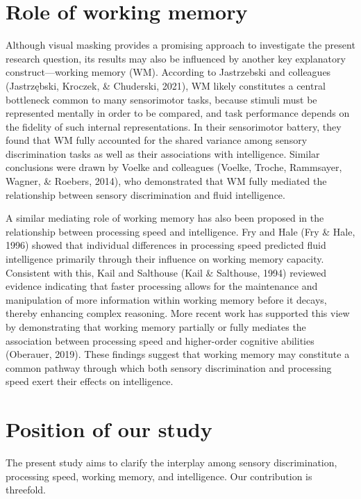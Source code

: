 \documentclass[
  ,man]{apa6}
\begin{document}
\section{Role of working memory}\label{role-of-working-memory}

Although visual masking provides a promising approach to investigate the present research question, its results may also be influenced by another key explanatory construct---working memory (WM). According to Jastrzebski and colleagues (Jastrzębski, Kroczek, \& Chuderski, 2021), WM likely constitutes a central bottleneck common to many sensorimotor tasks, because stimuli must be represented mentally in order to be compared, and task performance depends on the fidelity of such internal representations. In their sensorimotor battery, they found that WM fully accounted for the shared variance among sensory discrimination tasks as well as their associations with intelligence. Similar conclusions were drawn by Voelke and colleagues (Voelke, Troche, Rammsayer, Wagner, \& Roebers, 2014), who demonstrated that WM fully mediated the relationship between sensory discrimination and fluid intelligence.

A similar mediating role of working memory has also been proposed in the relationship between processing speed and intelligence. Fry and Hale (Fry \& Hale, 1996) showed that individual differences in processing speed predicted fluid intelligence primarily through their influence on working memory capacity. Consistent with this, Kail and Salthouse (Kail \& Salthouse, 1994) reviewed evidence indicating that faster processing allows for the maintenance and manipulation of more information within working memory before it decays, thereby enhancing complex reasoning. More recent work has supported this view by demonstrating that working memory partially or fully mediates the association between processing speed and higher-order cognitive abilities (Oberauer, 2019). These findings suggest that working memory may constitute a common pathway through which both sensory discrimination and processing speed exert their effects on intelligence.

\section{Position of our study}\label{position-of-our-study}

The present study aims to clarify the interplay among sensory discrimination, processing speed, working memory, and intelligence. Our contribution is threefold.
\end{document}
